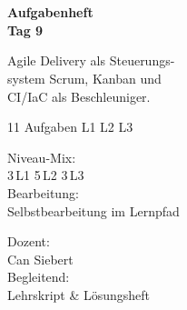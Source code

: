 \documentclass[11pt,a4paper,oneside]{article}
\begin{document}
\begin{titlepage}
  \pagestyle{empty}
  \vspace*{1.5cm}
  \\[2pt]
  \noindent{\color{lpAccent}\rule{\linewidth}{1.2pt}}\\[4pt]

  \vspace{3cm}
  {\sffamily\fontsize{30}{34}\selectfont\bfseries\color{lpInk}Aufgabenheft\\Tag 9\par}

  \vspace{0.7cm}
  {\sffamily\large\color{lpGray}Agile Delivery als Steuerungs-\\system \textendash{} Scrum, Kanban und\\CI/IaC als Beschleuniger.\par}

  \vspace{1.5cm}
  {\caveatfont\LARGE\color{lpAmber}11 Aufgaben \textperiodcentered{} L1 \textperiodcentered{} L2 \textperiodcentered{} L3}\par

  \vfill

  \noindent\begin{minipage}{0.55\linewidth}
    {\sffamily\footnotesize\color{lpGray}Niveau-Mix:}\\
    {\sffamily\small\color{lpInk}3\,\textsf{L1} \textperiodcentered{} 5\,\textsf{L2} \textperiodcentered{} 3\,\textsf{L3}}\\[10pt]
    {\sffamily\footnotesize\color{lpGray}Bearbeitung:}\\
    {\sffamily\small\color{lpInk}Selbstbearbeitung im Lernpfad}
  \end{minipage}\hfill
  \begin{minipage}{0.4\linewidth}
    \raggedleft
    {\sffamily\footnotesize\color{lpGray}Dozent:}\\
    {\sffamily\small\color{lpInk}Can Siebert}\\[10pt]
    {\sffamily\footnotesize\color{lpGray}Begleitend:}\\
    {\sffamily\small\color{lpInk}Lehrskript \& L\"osungsheft}
  \end{minipage}

  \vspace{0.5cm}
  \noindent{\color{lpAccent}\rule{\linewidth}{0.6pt}}
\end{titlepage}
\end{document}

